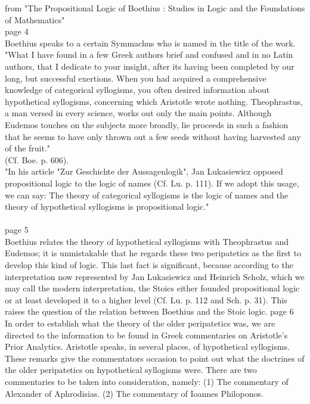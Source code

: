 \documentclass[10pt,a4paper]{book}
\begin{document}
	from "The Propositional Logic of Boethius : Studies in Logic and the Foundations of Mathematics"\\ 
	page 4	\\
	Boethius speaks to a certain Symmachus who is named in the title of the work.\\ 
	"What I have found in a few Greek authors brief and confused and in no Latin authors, that I dedicate to your insight, after its having been completed by our long, but successful exertions. When you had acquired a comprehensive knowledge of categorical syllogisms, you often desired information about hypothetical syllogisms, concerning which Aristotle wrote nothing. Theophrastus, a man versed in every science, works out only the main points. Although Eudemos touches on the subjects more broadly, lie proceeds in such a fashion that he seems to have only thrown out a few seeds without having harvested any of the fruit."\\
	(Cf. Boe. p. 606). 
	\\
	"In his article "Zur Geschichte der Aussagenlogik", Jan Lukasiewicz opposed propositional logic to the logic of names (Cf. Lu. p. 111). If we adopt this usage, we can say: The theory of categorical 
	syllogisms is the logic of names and the theory of hypothetical syllogisms is propositional logic."\\
	\\
	page 5\\
	Boethius relates the theory of hypothetical syllogisms with Theophrastus and Eudemos; it is unmistakable that he regards these two peripatetics as the first to develop this kind of logic. 
	This last fact is significant, because according to the interpretation now represented by Jan Lukasiewicz and Heinrich Scholz, which we may call the modern interpretation, the Stoics either founded 
	propositional logic or at least developed it to a higher level (Cf. Lu. p. 112 and Sch. p. 31). This raises the question of the relation between Boethius and the Stoic logic.
	page 6\\
	In order to establish what the theory of the older peripatetics was, we are directed to the information to be found in Greek commentaries on Aristotle's Prior Analytics. Aristotle speaks, in several places, of hypothetical syllogisms. These remarks give the commentators occasion to point out what the doctrines of the older peripatetics on hypothetical syllogisms were. There are two commentaries to be taken into consideration, namely: 
	(1) The commentary of Alexander of Aphrodisias. 
	(2) The commentary of Ioannes Philoponos. 
	
	
	
\end{document}
